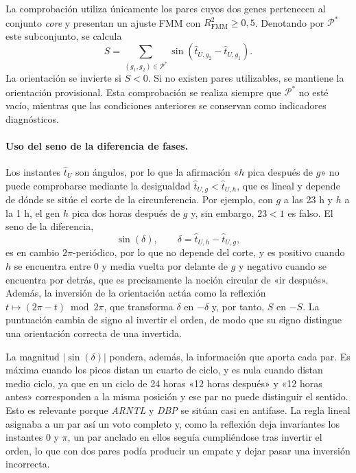 \documentclass[12pt, a4paper]{report}
\begin{document}
La comprobación utiliza únicamente los pares cuyos dos genes pertenecen al conjunto \textit{core} y presentan un ajuste FMM con \(R^2_{\mathrm{FMM}}\geq 0{,}5\). Denotando por \(\mathcal{P}^{*}\) este subconjunto, se calcula
\[
S=\sum_{(g_1,g_2)\in\mathcal{P}^{*}}\sin\!\left(\widehat{t}_{U,g_2}-\widehat{t}_{U,g_1}\right).
\]
La orientación se invierte si \(S<0\). Si no existen pares utilizables, se mantiene la orientación provisional. Esta comprobación se realiza siempre que \(\mathcal{P}^{*}\) no esté vacío, mientras que las condiciones anteriores se conservan como indicadores diagnósticos.

\iffalse
\paragraph{Uso del seno de la diferencia de fases.} Los instantes \(\widehat{t}_U\) son ángulos, por lo que la afirmación «\(h\) pica después de \(g\)» no puede comprobarse mediante la desigualdad \(\widehat{t}_{U,g}<\widehat{t}_{U,h}\), que es lineal y depende de dónde se sitúe el corte de la circunferencia. Por ejemplo, con \(g\) a las 23 h y \(h\) a la 1 h, el gen \(h\) pica dos horas después de \(g\) y, sin embargo, \(23<1\) es falso. El seno de la diferencia,
\[
\sin(\delta),\qquad \delta=\widehat{t}_{U,h}-\widehat{t}_{U,g},
\]
es en cambio \(2\pi\)-periódico, por lo que no depende del corte, y es positivo cuando \(h\) se encuentra entre \(0\) y media vuelta por delante de \(g\) y negativo cuando se encuentra por detrás, que es precisamente la noción circular de «ir después». Además, la inversión de la orientación actúa como la reflexión \(t\mapsto(2\pi-t)\bmod 2\pi\), que transforma \(\delta\) en \(-\delta\) y, por tanto, \(S\) en \(-S\). La puntuación cambia de signo al invertir el orden, de modo que su signo distingue una orientación correcta de una invertida.

La magnitud \(\lvert\sin(\delta)\rvert\) pondera, además, la información que aporta cada par. Es máxima cuando los picos distan un cuarto de ciclo, y es nula cuando distan medio ciclo, ya que en un ciclo de 24 horas «12 horas después» y «12 horas antes» corresponden a la misma posición y ese par no puede distinguir el sentido. Esto es relevante porque \textit{ARNTL} y \textit{DBP} se sitúan casi en antifase. La regla lineal asignaba a un par así un voto completo y, como la reflexión deja invariantes los instantes \(0\) y \(\pi\), un par anclado en ellos seguía cumpliéndose tras invertir el orden, lo que con dos pares podía producir un empate y dejar pasar una inversión incorrecta.
\end{document}
